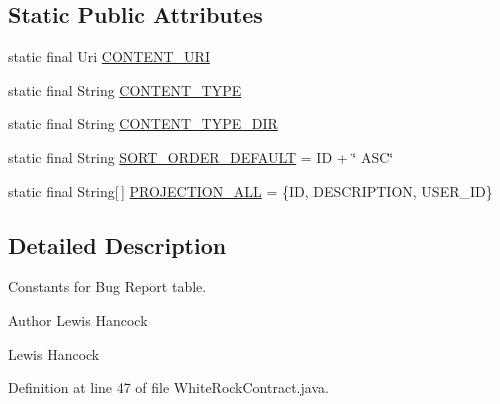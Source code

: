 \subsection*{Static Public Attributes}
\begin{DoxyCompactItemize}
\item 
static final Uri \hyperlink{classuk_1_1ac_1_1swan_1_1digitaltrails_1_1database_1_1_white_rock_contract_1_1_bug_report_ace8309671f9ee1578f023cef94db0380}{C\+O\+N\+T\+E\+N\+T\+\_\+\+U\+R\+I}
\item 
static final String \hyperlink{classuk_1_1ac_1_1swan_1_1digitaltrails_1_1database_1_1_white_rock_contract_1_1_bug_report_a7ec6511186475b6e50129229ff736ec7}{C\+O\+N\+T\+E\+N\+T\+\_\+\+T\+Y\+P\+E}
\item 
static final String \hyperlink{classuk_1_1ac_1_1swan_1_1digitaltrails_1_1database_1_1_white_rock_contract_1_1_bug_report_a341512426531ad69274608399249155d}{C\+O\+N\+T\+E\+N\+T\+\_\+\+T\+Y\+P\+E\+\_\+\+D\+I\+R}
\item 
static final String \hyperlink{classuk_1_1ac_1_1swan_1_1digitaltrails_1_1database_1_1_white_rock_contract_1_1_bug_report_a9ffe10ee3fb21442adf0d23d84d03bf9}{S\+O\+R\+T\+\_\+\+O\+R\+D\+E\+R\+\_\+\+D\+E\+F\+A\+U\+L\+T} = I\+D + \char`\"{} A\+S\+C\char`\"{}
\item 
static final String\mbox{[}$\,$\mbox{]} \hyperlink{classuk_1_1ac_1_1swan_1_1digitaltrails_1_1database_1_1_white_rock_contract_1_1_bug_report_a5f3b7a2b5599734822ed035a4b81d549}{P\+R\+O\+J\+E\+C\+T\+I\+O\+N\+\_\+\+A\+L\+L} = \{I\+D, D\+E\+S\+C\+R\+I\+P\+T\+I\+O\+N, U\+S\+E\+R\+\_\+\+I\+D\}
\end{DoxyCompactItemize}


\subsection{Detailed Description}
Constants for Bug Report table. 

\begin{DoxyAuthor}{Author}
Lewis Hancock 

Lewis Hancock 
\end{DoxyAuthor}


Definition at line 47 of file White\+Rock\+Contract.\+java.



